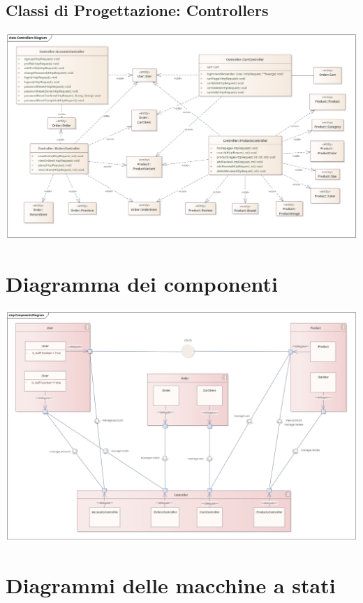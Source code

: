 \subsection{Classi di Progettazione: Controllers}
\begin{center}
  \includegraphics[width=\textwidth]{immagini/Progettazione/ClassDiagrams/Controllers.png}
\end{center}

\section{Diagramma dei componenti}
\begin{center}
  \includegraphics[width=\textwidth]{immagini/Progettazione/ComponentsDiagram.png}
\end{center}
    
\section{Diagrammi delle macchine a stati}
